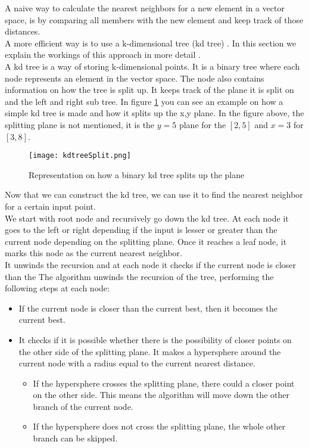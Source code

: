A naive way to calculate the nearest neighbors for a new element in a vector space, is by comparing all members with the new element and keep track of those distances. \\
A more efficient way is to use a k-dimensional tree (kd tree) \cite{kdtree:article}. In this section we explain the workings of this approach in more detail \cite{kdtreeIntro:atricle}. \\

A kd tree is a way of storing k-dimensional points. It is a binary tree where each node represents an element in the vector space. The node also contains information on how the tree is split up. It keeps track of the plane it is split on and the left and right sub tree. In figure \ref{fig:kdtreeSplit} you can see an example on how a simple kd tree is made and how it splits up the x,y plane. In the figure above, the splitting plane is not mentioned, it is the $y=5$ plane for the $[2,5]$ and $x=3$ for $[3,8]$.
	
\begin{figure}[htbp]
	\centering
	\texttt{[image: kdtreeSplit.png]}
	\caption{Representation on how a binary kd tree splits up the plane  \cite{kdtreeIntro:atricle}}
	\label{fig:kdtreeSplit}
\end{figure}

Now that we can construct the kd tree, we can use it to find the nearest neighbor for a certain input point. \\
We start with root node and recursively go down the kd tree. At each node it goes to the left or right depending if the input is lesser or greater than the current node depending on the splitting plane. Once it reaches a leaf node, it marks this node as the current nearest neighbor. \\
It unwinds the recursion and at each node it checks if the current node is closer than the
The algorithm unwinds the recursion of the tree, performing the following steps at each node:
\begin{itemize}

\item If the current node is closer than the current best, then it becomes the current best.
\item It checks if it is possible whether there is the possibility of closer points on the other side of the splitting plane. It makes a hypersphere around the current node with a radius equal to the current nearest distance. 
\begin{itemize}
\item If the hypersphere crosses the splitting plane, there could a closer point on the other side. This means the algorithm will move down the other branch of the current node.
\item If the hypersphere does not cross the splitting plane, the whole other branch can be skipped.
\end{itemize}
\end{itemize}

